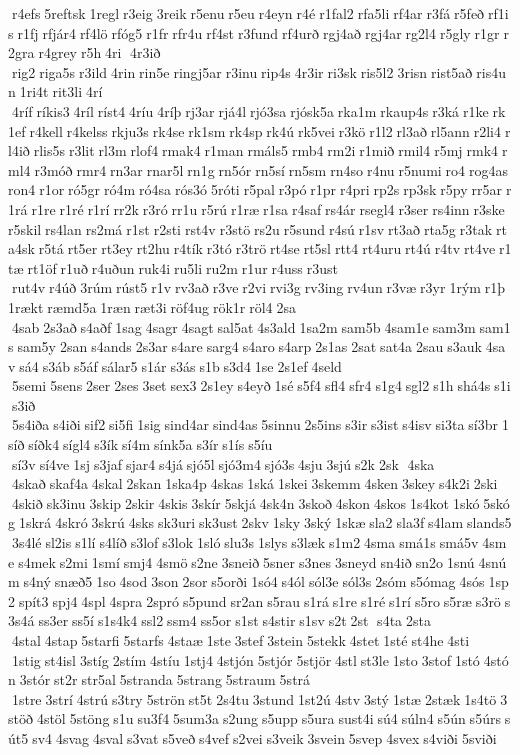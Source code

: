  r4efs 5reftsk 1regl r3eig 3reik r5enu r5eu r4eyn r4é r1fal2 rfa5li rf4ar r3fá r5feð rf1is r1fj rfjár4 rf4lö rfóg5 r1fr rfr4u rf4st r3fund rf4urð rgj4að rgj4ar rg2l4 r5gly r1gr r2gra r4grey r5h 4ri  4r3ið  rig2 riga5s r3ild 4rin rin5e ringj5ar r3inu rip4s 4r3ir ri3sk ris5l2 3risn rist5að ris4un 1ri4t rit3li 4rí  4ríf ríkis3 4ríl ríst4 4ríu 4ríþ rj3ar rjá4l rjó3sa rjósk5a rka1m rkaup4s r3ká r1ke rk1ef r4kell r4kelss rkju3s rk4se rk1sm rk4sp rk4ú rk5vei r3kö r1l2 rl3að rl5ann r2li4 rl4ið rlis5s r3lit rl3m rlof4 rmak4 r1man rmáls5 rmb4 rm2i r1mið rmil4 r5mj rmk4 rml4 r3móð rmr4 rn3ar rnar5l rn1g rn5ór rn5sí rn5sm rn4so r4nu r5numi ro4 rog4as ron4 r1or ró5gr ró4m ró4sa rós3ó 5róti r5pal r3pó r1pr r4pri rp2s rp3sk r5py rr5ar r1rá r1re r1ré r1rí rr2k r3ró rr1u r5rú r1ræ r1sa r4saf rs4ár rsegl4 r3ser rs4inn r3ske r5skil rs4lan rs2má r1st r2sti rst4v r3stö rs2u r5sund r4sú r1sv rt3að rta5g r3tak rta4sk r5tá rt5er rt3ey rt2hu r4tík r3tó r3trö rt4se rt5sl rtt4 rt4uru rt4ú r4tv rt4ve r1tæ rt1öf r1uð r4uðun ruk4i ru5li ru2m r1ur r4uss r3ust  rut4v r4úð 3rúm rúst5 r1v rv3að r3ve r2vi rvi3g rv3ing rv4un r3væ r3yr 1rým r1þ 1rækt ræmd5a 1ræn ræt3i röf4ug rök1r röl4 2sa  4sab 2s3að s4aðf 1sag 4sagr 4sagt sal5at 4s3ald 1sa2m sam5b 4sam1e sam3m sam1s sam5y 2san s4ands 2s3ar s4are sarg4 s4aro s4arp 2s1as 2sat sat4a 2sau s3auk 4sav sá4 s3áb s5áf sálar5 s1ár s3ás s1b s3d4 1se 2s1ef 4seld  5semi 5sens 2ser 2ses 3set sex3 2s1ey s4eyð 1sé s5f4 sfl4 sfr4 s1g4 sgl2 s1h shá4s s1i s3ið  5s4iða s4iði sif2 si5fi 1sig sind4ar sind4as 5sinnu 2s5ins s3ir s3ist s4isv si3ta sí3br 1síð síðk4 sígl4 s3ík sí4m sínk5a s3ír s1ís s5íu  sí3v sí4ve 1sj s3jaf sjar4 s4já sjó5l sjó3m4 sjó3s 4sju 3sjú s2k 2sk  4ska  4skað skaf4a 4skal 2skan 1ska4p 4skas 1ská 1skei 3skemm 4sken 3skey s4k2i 2ski  4skið sk3inu 3skip 2skir 4skis 3skír 5skjá 4sk4n 3skoð 4skon 4skos 1s4kot 1skó 5skóg 1skrá 4skró 3skrú 4sks sk3uri sk3ust 2skv 1sky 3ský 1skæ sla2 sla3f s4lam slands5 3s4lé sl2is s1lí s4líð s3lof s3lok 1sló slu3s 1slys s3læk s1m2 4sma smá1s smá5v 4sme s4mek s2mi 1smí smj4 4smö s2ne 3sneið 5sner s3nes 3sneyd sn4ið sn2o 1snú 4snúm s4ný snæð5 1so 4sod 3son 2sor s5orði 1só4 s4ól sól3e sól3s 2sóm s5ómag 4sós 1sp2 spít3 spj4 4spl 4spra 2spró s5pund sr2an s5rau s1rá s1re s1ré s1rí s5ro s5ræ s3rö s3s4á ss3er ss5í s1s4k4 ssl2 ssm4 ss5or s1st s4stir s1sv s2t 2st  s4ta 2sta  4stal 4stap 5starfi 5starfs 4staæ 1ste 3stef 3stein 5stekk 4stet 1sté st4he 4sti  1stig st4isl 3stíg 2stím 4stíu 1stj4 4stjón 5stjór 5stjör 4stl st3le 1sto 3stof 1stó 4stón 3stór st2r str5al 5stranda 5strang 5straum 5strá  1stre 3strí 4strú s3try 5strön st5t 2s4tu 3stund 1st2ú 4stv 3stý 1stæ 2stæk 1s4tö 3stöð 4stöl 5stöng s1u su3f4 5sum3a s2ung s5upp s5ura sust4i sú4 súln4 s5ún s5úrs sút5 sv4 4svag 4sval s3vat s5veð s4vef s2vei s3veik 3svein 5svep 4svex s4viði 5sviði 